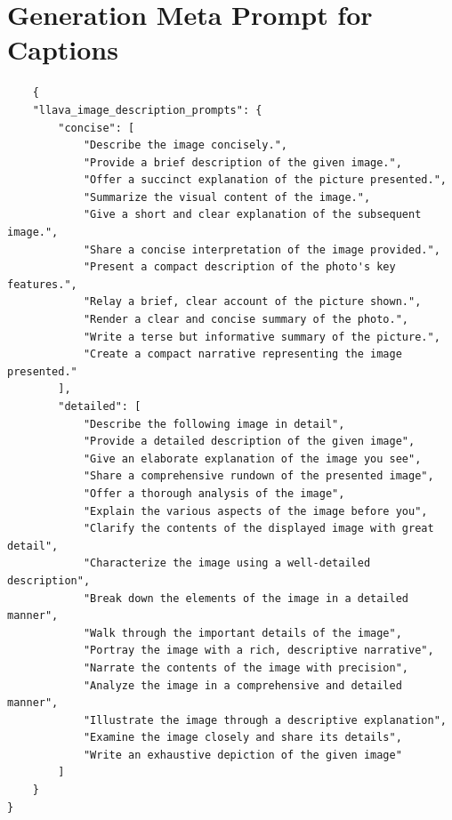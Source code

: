 \section{Generation Meta Prompt for Captions}
\label{app:generation_prompt_caption}

\begin{verbatim}
    {
    "llava_image_description_prompts": {
        "concise": [
            "Describe the image concisely.",
            "Provide a brief description of the given image.",
            "Offer a succinct explanation of the picture presented.",
            "Summarize the visual content of the image.",
            "Give a short and clear explanation of the subsequent image.",
            "Share a concise interpretation of the image provided.",
            "Present a compact description of the photo's key features.",
            "Relay a brief, clear account of the picture shown.",
            "Render a clear and concise summary of the photo.",
            "Write a terse but informative summary of the picture.",
            "Create a compact narrative representing the image presented."
        ],
        "detailed": [
            "Describe the following image in detail",
            "Provide a detailed description of the given image",
            "Give an elaborate explanation of the image you see",
            "Share a comprehensive rundown of the presented image",
            "Offer a thorough analysis of the image",
            "Explain the various aspects of the image before you",
            "Clarify the contents of the displayed image with great detail",
            "Characterize the image using a well-detailed description",
            "Break down the elements of the image in a detailed manner",
            "Walk through the important details of the image",
            "Portray the image with a rich, descriptive narrative",
            "Narrate the contents of the image with precision",
            "Analyze the image in a comprehensive and detailed manner",
            "Illustrate the image through a descriptive explanation",
            "Examine the image closely and share its details",
            "Write an exhaustive depiction of the given image"
        ]
    }
}
\end{verbatim}

